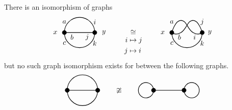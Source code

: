\begin{example}
  There is an isomorphism of graphs
  \begin{equation*}
    \begin{tikzpicture}[scale = 1.5, baseline=-1mm]
      \draw[thick] (0, 0) node at (-.3, 0) {$x$} -- (1, 0) node at (1.3, 0) {$y$};
      \draw[thick] (0, 0) arc (180:0:.5);
      \draw[thick] (0, 0) arc (-180:0:.5);
      \draw[fill=black] (0, 0) circle (2pt);
      \draw[fill=black] (1, 0) circle (2pt);
      \node at (0, .35) {$a$};
      \node at (.25, -.15) {$b$};
      \node at (0, -.35) {$c$};
      \node at (1, .35) {$i$};
      \node at (0.75, -.15) {$j$};
      \node at (1, -.35) {$k$};
    \end{tikzpicture}
    \qquad \underset{
      \begin{aligned}
        i &\mapsto j \\ 
        j &\mapsto i
      \end{aligned}
      }{\cong} \qquad
    \begin{tikzpicture}[scale = 1.5, baseline=-1mm]
      \draw[thick] plot[smooth, tension=1] coordinates { (0, 0) (.3, 0) (.7, .4) (1, 0) };
      \draw[thick] plot[smooth, tension=1] coordinates { (0, 0) (.3, .4) (.7, 0) (1, 0) };
      \draw[thick] (0, 0) arc (-180:0:.5);
      \draw[fill=black] (0, 0) circle (2pt);
      \draw[fill=black] (1, 0) circle (2pt);
      \node at (-.3, 0) {$x$};
      \node at (1.25, 0) {$y$};
      \node at (0, .35) {$a$};
      \node at (.25, -.15) {$b$};
      \node at (0, -.35) {$c$};
      \node at (1, .35) {$j$};
      \node at (0.75, -.15) {$i$};
      \node at (1, -.35) {$k$};
    \end{tikzpicture}
  \end{equation*}
  but no such graph isomorphism exists for between the following graphs.
  \begin{equation*}
  \begin{tikzpicture}[scale = 1.5, baseline=-1mm]
    \draw[thick] (0, 0) -- (1, 0);
    \draw[thick] (0, 0) arc (180:0:.5);
    \draw[thick] (0, 0) arc (-180:0:.5);
    \draw[fill=black] (0, 0) circle (2pt);
    \draw[fill=black] (1, 0) circle (2pt);
  \end{tikzpicture}
  \qquad \ncong \qquad
  \begin{tikzpicture}[scale =1.5, baseline=-1mm]
    \draw[thick] (0, 0) -- (1, 0);
    \draw[thick] (-.25, 0) circle (2.5mm);
    \draw[thick] (1.25, 0) circle (2.5mm);
    \draw[fill=black] (0, 0) circle (2pt);
    \draw[fill=black] (1, 0) circle (2pt);
  \end{tikzpicture}
  \end{equation*}
\end{example}

